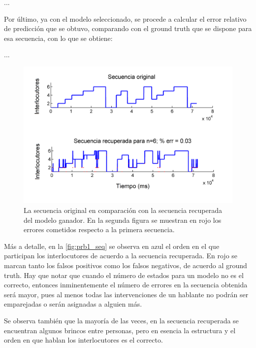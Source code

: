 ...

Por último, ya con el modelo seleccionado, se procede a calcular el error relativo de predicción que se obtuvo, comparando con el ground truth que se dispone para esa secuencia, con lo que se obtiene: 

...

\begin{figure}[bht]
  \centerline
  {\includegraphics[width=0.8\linewidth]{gfx/chap6/cuervo1_}} \quad
  \caption{La secuencia original en comparación con la secuencia recuperada del modelo ganador. En la segunda figura se muestran en rojo los errores cometidos respecto a la primera secuencia. }
  \label{fig:prb1_seq}
\end{figure}

Más a detalle, en la \autoref{fig:prb1_seq} se observa en azul el orden en el que participan los interlocutores de acuerdo a la secuencia recuperada. En rojo se marcan tanto los falsos positivos como los falsos negativos, de acuerdo al ground truth. Hay que notar que cuando el número de estados para un modelo no es el correcto, entonces inminentemente el número de errores en la secuencia obtenida será mayor, pues al menos todas las intervenciones de un hablante no podrán ser emparejadas o serán asignadas a alguien más.

Se observa también que la mayoría de las veces, en la secuencia recuperada se encuentran algunos brincos entre personas, pero en esencia la estructura y el orden en que hablan los interlocutores es el correcto.


